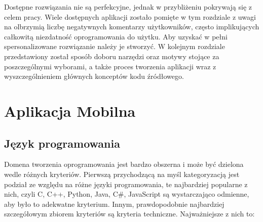 \documentclass[skorowidz,skroty]{dyplomWEZUT}
\begin{document}
Dostępne rozwiązania nie są perfekcyjne, jednak w przybliżeniu pokrywają się z celem pracy. Wiele dostępnych aplikacji zostało pomięte w tym rozdziale z uwagi na olbrzymią liczbę negatywnych komentarzy użytkowników, często implikujących całkowitą niezdatność oprogramowania do użytku. Aby uzyskać w pełni spersonalizowane rozwiązanie należy je stworzyć. W kolejnym rozdziale przedstawiony został sposób doboru narzędzi oraz motywy stojące za poszczególnymi wyborami, a także proces tworzenia aplikacji wraz z wyszczególnieniem głównych konceptów kodu źródłowego.

\chapter{Aplikacja Mobilna}\label{chap:Mobile App}

\section{Język programowania}\label{sec: language}
Domena tworzenia oprogramowania jest bardzo obszerna i może być dzielona wedle różnych kryteriów. Pierwszą przychodzącą na myśl kategoryzacją jest podział ze względu na różne języki programowania, te najbardziej popularne z nich, czyli C, C++, Python, Java, C\#, JavaScript są wystarczająco odmienne, aby było to adekwatne kryterium. Innym, prawdopodobnie najbardziej szczegółowym zbiorem kryteriów są kryteria techniczne. Najważniejsze z nich to:
\end{document}
